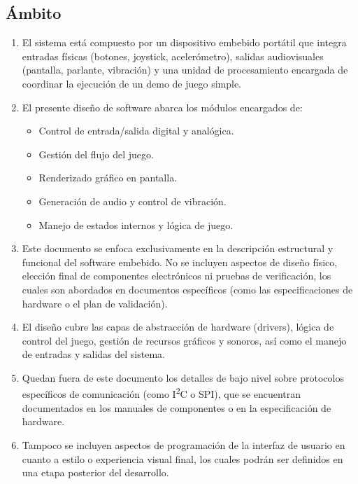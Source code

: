 \documentclass[11pt,a4paper]{article}
\begin{document}
\subsection{Ámbito}
\begin{enumerate}
  \item El sistema está compuesto por un dispositivo embebido portátil que integra entradas físicas (botones, joystick, acelerómetro), salidas audiovisuales (pantalla, parlante, vibración) y una unidad de procesamiento encargada de coordinar la ejecución de un demo de juego simple.
  \item El presente diseño de software abarca los módulos encargados de:
  \begin{itemize}
    \item Control de entrada/salida digital y analógica.
    \item Gestión del flujo del juego.
    \item Renderizado gráfico en pantalla.
    \item Generación de audio y control de vibración.
    \item Manejo de estados internos y lógica de juego.
  \end{itemize}
  \item Este documento se enfoca exclusivamente en la descripción estructural y funcional del software embebido. No se incluyen aspectos de diseño físico, elección final de componentes electrónicos ni pruebas de verificación, los cuales son abordados en documentos específicos (como las especificaciones de hardware o el plan de validación).
  \item El diseño cubre las capas de abstracción de hardware (drivers), lógica de control del juego, gestión de recursos gráficos y sonoros, así como el manejo de entradas y salidas del sistema. 
  \item Quedan fuera de este documento los detalles de bajo nivel sobre protocolos específicos de comunicación (como I\textsuperscript{2}C o SPI), que se encuentran documentados en los manuales de componentes o en la especificación de hardware.
  \item Tampoco se incluyen aspectos de programación de la interfaz de usuario en cuanto a estilo o experiencia visual final, los cuales podrán ser definidos en una etapa posterior del desarrollo.
\end{enumerate}
\end{document}
